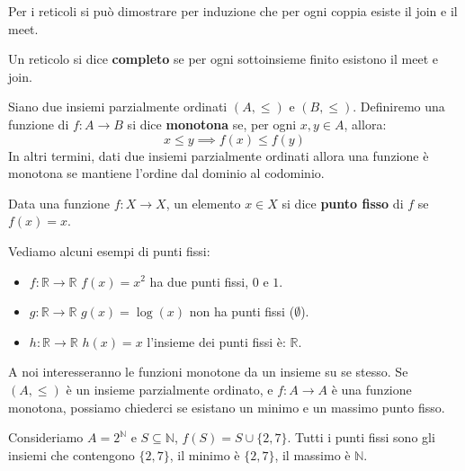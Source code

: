 Per i reticoli si può dimostrare per induzione che per ogni coppia esiste il join
e il meet.
\begin{definizione}
    Un reticolo si dice \textbf{completo} se per ogni sottoinsieme finito esistono
    il meet e join.
\end{definizione}
\begin{definizione}
    Siano due insiemi parzialmente ordinati $(A,\leq)$ e $(B,\leq)$. Definiremo
    una funzione di $f: A \to B$ si dice \textbf{monotona} se, per ogni $x, y
        \in A$, allora:
    \begin{equation}
        x \leq y \implies f(x) \leq f(y)
    \end{equation}
    In altri termini, dati due insiemi parzialmente ordinati allora una funzione
    è monotona se mantiene l'ordine dal dominio al codominio.
\end{definizione}
\begin{definizione}
    Data una funzione $f: X \to X$, un elemento $x \in X$ si dice \textbf{punto
        fisso} di $f$ se $f(x) = x$.
\end{definizione}
\begin{esempio}
    Vediamo alcuni esempi di punti fissi:
    \begin{itemize}
        \item $f: \mathbb{R} \to \mathbb{R}$ $f(x) = x^2$ ha due punti fissi,
              $0$ e $1$.
        \item $g: \mathbb{R} \to \mathbb{R}$ $g(x) = \log(x)$ non ha punti fissi
              ($\emptyset$).
        \item $h: \mathbb{R} \to \mathbb{R}$ $h(x) = x$ l'insieme dei punti fissi
              è: $\mathbb{R}$.
    \end{itemize}
\end{esempio}
A noi interesseranno le funzioni monotone da un insieme su se stesso.
Se $(A, \leq)$ è un insieme parzialmente ordinato, e $f: A \to A$ è una funzione
monotona, possiamo chiederci se esistano un minimo e un massimo punto fisso.
\begin{esempio}
    Consideriamo $A = 2^\mathbb{N}$ e $S\subseteq \mathbb{N}$, $f(S)=S\cup \{2,7\}$.
    Tutti i punti fissi sono gli insiemi che contengono $\{2,7\}$, il minimo è
    $\{2,7\}$, il massimo è $\mathbb{N}$.
\end{esempio}
